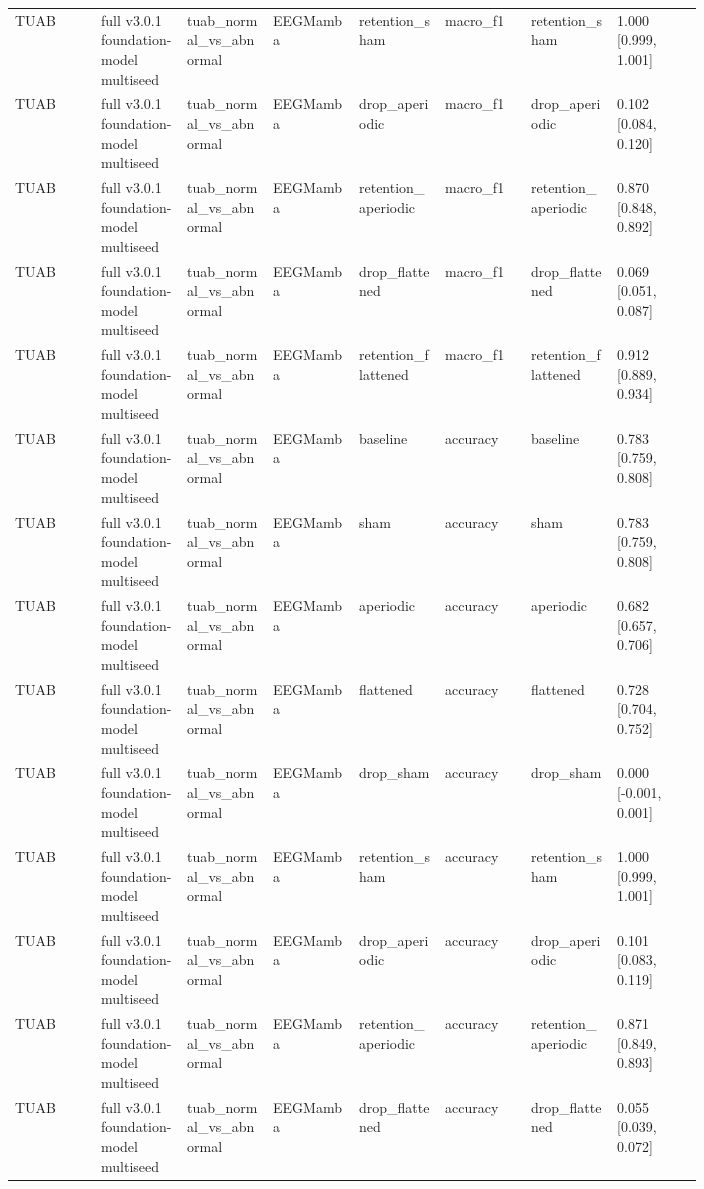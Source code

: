 \begin{longtable}{p{0.10\linewidth}p{0.10\linewidth}p{0.10\linewidth}p{0.10\linewidth}p{0.10\linewidth}p{0.10\linewidth}p{0.10\linewidth}p{0.10\linewidth}}
TUAB & full v3.0.1 foundation-model multiseed & tuab\_normal\_vs\_abnormal & EEGMamba & retention\_sham & macro\_f1 & retention\_sham & 1.000 [0.999, 1.001]\\
TUAB & full v3.0.1 foundation-model multiseed & tuab\_normal\_vs\_abnormal & EEGMamba & drop\_aperiodic & macro\_f1 & drop\_aperiodic & 0.102 [0.084, 0.120]\\
TUAB & full v3.0.1 foundation-model multiseed & tuab\_normal\_vs\_abnormal & EEGMamba & retention\_aperiodic & macro\_f1 & retention\_aperiodic & 0.870 [0.848, 0.892]\\
TUAB & full v3.0.1 foundation-model multiseed & tuab\_normal\_vs\_abnormal & EEGMamba & drop\_flattened & macro\_f1 & drop\_flattened & 0.069 [0.051, 0.087]\\
TUAB & full v3.0.1 foundation-model multiseed & tuab\_normal\_vs\_abnormal & EEGMamba & retention\_flattened & macro\_f1 & retention\_flattened & 0.912 [0.889, 0.934]\\
TUAB & full v3.0.1 foundation-model multiseed & tuab\_normal\_vs\_abnormal & EEGMamba & baseline & accuracy & baseline & 0.783 [0.759, 0.808]\\
TUAB & full v3.0.1 foundation-model multiseed & tuab\_normal\_vs\_abnormal & EEGMamba & sham & accuracy & sham & 0.783 [0.759, 0.808]\\
TUAB & full v3.0.1 foundation-model multiseed & tuab\_normal\_vs\_abnormal & EEGMamba & aperiodic & accuracy & aperiodic & 0.682 [0.657, 0.706]\\
TUAB & full v3.0.1 foundation-model multiseed & tuab\_normal\_vs\_abnormal & EEGMamba & flattened & accuracy & flattened & 0.728 [0.704, 0.752]\\
TUAB & full v3.0.1 foundation-model multiseed & tuab\_normal\_vs\_abnormal & EEGMamba & drop\_sham & accuracy & drop\_sham & 0.000 [-0.001, 0.001]\\
TUAB & full v3.0.1 foundation-model multiseed & tuab\_normal\_vs\_abnormal & EEGMamba & retention\_sham & accuracy & retention\_sham & 1.000 [0.999, 1.001]\\
TUAB & full v3.0.1 foundation-model multiseed & tuab\_normal\_vs\_abnormal & EEGMamba & drop\_aperiodic & accuracy & drop\_aperiodic & 0.101 [0.083, 0.119]\\
TUAB & full v3.0.1 foundation-model multiseed & tuab\_normal\_vs\_abnormal & EEGMamba & retention\_aperiodic & accuracy & retention\_aperiodic & 0.871 [0.849, 0.893]\\
TUAB & full v3.0.1 foundation-model multiseed & tuab\_normal\_vs\_abnormal & EEGMamba & drop\_flattened & accuracy & drop\_flattened & 0.055 [0.039, 0.072]\\

\end{longtable}
